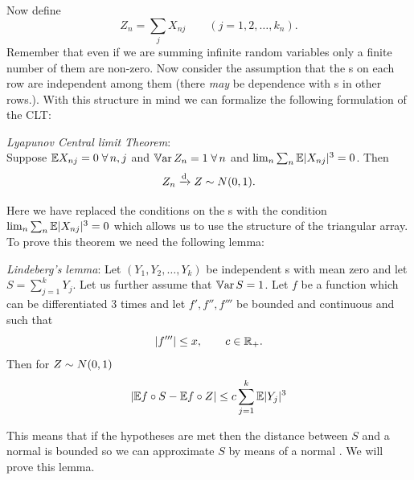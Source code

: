 \documentclass{report}
\begin{document}
Now define
\[Z_{n}=\sum_{j}X_{nj} \qquad(j=1,2,\ldots,k_{n}).\]
Remember that even if we are summing infinite random variables only a finite number of them are non-zero. Now consider the assumption that the \rv s on each row are independent among them (there \textit{may} be dependence with \rv s in other rows.). With this structure in mind we can formalize the following formulation of the CLT:
\begin{theorem}
	\emph{Lyapunov Central limit Theorem}:\\
	Suppose $\mathbb{E} X_{nj}=0\;\forall\, n,j$ and $\mathbb{V}\mathrm{ar}\, Z_{n}=1\;\forall\, n$ and $\lim_{n}\sum_n\mathbb{E}|X_{nj}|^{3}=0$. Then
	\[Z_{n}\xrightarrow[]{\text{d}} Z\sim N(0,1).\]
\end{theorem}
Here we have replaced the conditions on the \rv s with the condition $\lim_{n}\sum_n\mathbb{E}|X_{nj}|^{3}=0$ which allows us to use the structure of the triangular array. To prove this theorem we need the following lemma:
\begin{lemma}
	\emph{Lindeberg's lemma}:
	Let $(Y_1,Y_2,\ldots,Y_k)$ be independent \rv s with mean zero and let $S=\sum_{j=1}^{k}Y_{j}$. Let us further assume that $\mathbb{V}\mathrm{ar}\, S=1$. Let $f$ be a function which can be differentiated 3 times and let 
	$f',f'',f'''$ be bounded and continuous and such that
	\[|f'''|\leq x,\qquad c\in\mathbb{R}_+.\]
	Then for $Z\sim N(0,1)$
	\[|\mathbb{E} f\circ S-\mathbb{E} f\circ Z|\leq c\sum_{j=1}^{k}\mathbb{E}|Y_{j}|^{3}\]
\end{lemma}
This means that if the hypotheses are met then the distance between $S$ and a normal \rv{} is bounded so we can approximate $S$ by means of a normal \rv{}. We will prove this lemma.
\end{document}
